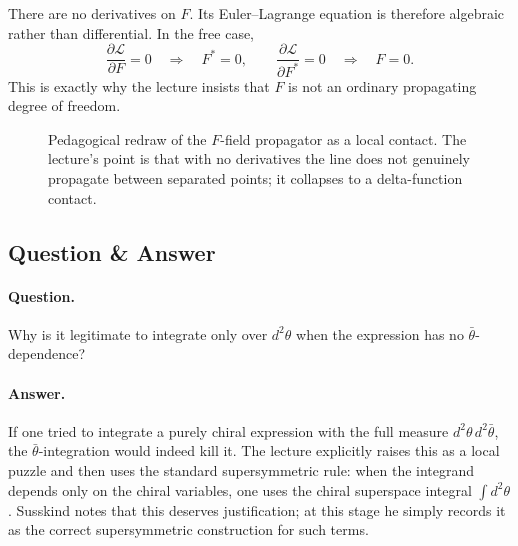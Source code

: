There are no derivatives on \(F\). Its Euler--Lagrange equation is therefore algebraic rather than differential. In the free case,
\begin{equation}
\frac{\partial \mathcal L}{\partial F}=0 \quad \Rightarrow \quad F^\ast=0,
\qquad
\frac{\partial \mathcal L}{\partial F^\ast}=0 \quad \Rightarrow \quad F=0.
\end{equation}
This is exactly why the lecture insists that \(F\) is not an ordinary propagating degree of freedom.

\begin{figure}
\centering
{}
\caption{Pedagogical redraw of the \(F\)-field propagator as a local contact. The lecture's point is that with no derivatives the line does not genuinely propagate between separated points; it collapses to a delta-function contact.}
\end{figure}

\subsection{Question \& Answer}

\paragraph{Question.} Why is it legitimate to integrate only over \(d^2\theta\) when the expression has no \(\bar\theta\)-dependence?

\paragraph{Answer.} If one tried to integrate a purely chiral expression with the full measure \(d^2\theta\,d^2\bar\theta\), the \(\bar\theta\)-integration would indeed kill it. The lecture explicitly raises this as a local puzzle and then uses the standard supersymmetric rule: when the integrand depends only on the chiral variables, one uses the chiral superspace integral \(\int d^2\theta\). Susskind notes that this deserves justification; at this stage he simply records it as the correct supersymmetric construction for such terms.

